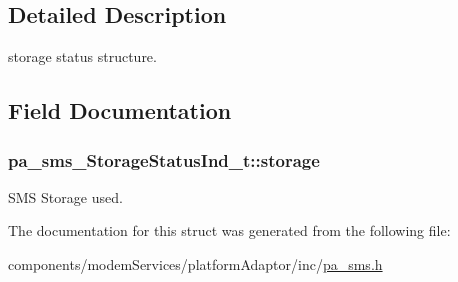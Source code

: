 \subsection{Detailed Description}
storage status structure. 

\subsection{Field Documentation}
\subsubsection[{\texorpdfstring{storage}{storage}}]{ pa\+\_\+sms\+\_\+\+Storage\+Status\+Ind\+\_\+t\+::storage}\hypertarget{structpa__sms___storage_status_ind__t_ae72a0c32f5bbad1b1f88fc51812c6164}{}\label{structpa__sms___storage_status_ind__t_ae72a0c32f5bbad1b1f88fc51812c6164}


S\+MS Storage used. 



The documentation for this struct was generated from the following file\+:\begin{DoxyCompactItemize}
\item 
components/modem\+Services/platform\+Adaptor/inc/\hyperlink{pa__sms_8h}{pa\+\_\+sms.\+h}\end{DoxyCompactItemize}
